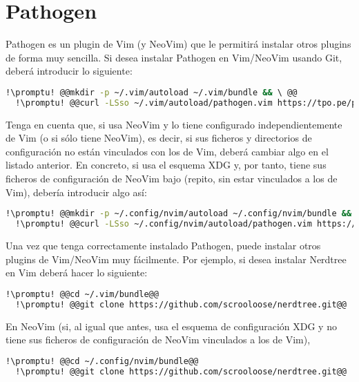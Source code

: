 \section{Pathogen}\label{sec:pathogen}
Pathogen es un plugin de Vim (y NeoVim) que le permitirá instalar otros plugins de forma muy sencilla. Si desea
instalar Pathogen en Vim/NeoVim usando Git, deberá introducir lo siguiente:

\begin{lstlisting}[gobble=2,language=bash,style=bashinteract,escapechar=!]
  !\promptu! @@mkdir -p ~/.vim/autoload ~/.vim/bundle && \ @@
  !\promptu! @@curl -LSso ~/.vim/autoload/pathogen.vim https://tpo.pe/pathogen.vim@@
\end{lstlisting}

Tenga en cuenta que, si usa NeoVim y lo tiene configurado independientemente de Vim (o si sólo tiene NeoVim),
es decir, si sus ficheros y directorios de configuración no están vinculados con los de Vim, deberá cambiar algo
en el listado anterior. En concreto, si usa el esquema XDG y, por tanto, tiene sus ficheros de configuración de
NeoVim bajo  (repito, sin estar vinculados a los de Vim), debería introducir algo así:

\begin{lstlisting}[gobble=2,language=bash,style=bashinteract,escapechar=!]
  !\promptu! @@mkdir -p ~/.config/nvim/autoload ~/.config/nvim/bundle && \ @@
  !\promptu! @@curl -LSso ~/.config/nvim/autoload/pathogen.vim https://tpo.pe/pathogen.vim@@
\end{lstlisting}

Una vez que tenga correctamente instalado Pathogen, puede instalar otros plugins de Vim/NeoVim muy fácilmente.
Por ejemplo, si desea instalar Nerdtree en Vim deberá hacer lo siguiente:

\begin{lstlisting}[gobble=2,language=bash,style=bashinteract,escapechar=!]
  !\promptu! @@cd ~/.vim/bundle@@
  !\promptu! @@git clone https://github.com/scrooloose/nerdtree.git@@
\end{lstlisting}

En NeoVim (si, al igual que antes, usa el esquema de configuración XDG y no tiene sus ficheros de configuración
de NeoVim vinculados a los de Vim),

\begin{lstlisting}[gobble=2,language=bash,style=bashinteract,escapechar=!]
  !\promptu! @@cd ~/.config/nvim/bundle@@
  !\promptu! @@git clone https://github.com/scrooloose/nerdtree.git@@
\end{lstlisting}
